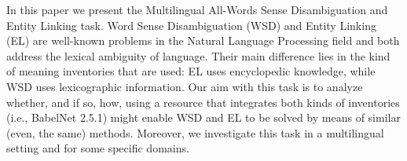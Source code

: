In this paper we present the Multilingual All-Words Sense Disambiguation and Entity Linking task. Word Sense Disambiguation (WSD) and Entity Linking (EL) are well-known problems in the Natural Language Processing field and both address the lexical ambiguity of language. Their main difference lies in the kind of meaning inventories that are used: EL uses encyclopedic knowledge, while WSD uses lexicographic information. Our aim with this task is to analyze whether, and if so, how, using a resource that integrates both kinds of inventories (i.e., BabelNet 2.5.1) might enable WSD and EL to be solved by means of similar (even, the same) methods. Moreover, we investigate this task in a multilingual setting and for some specific domains.

